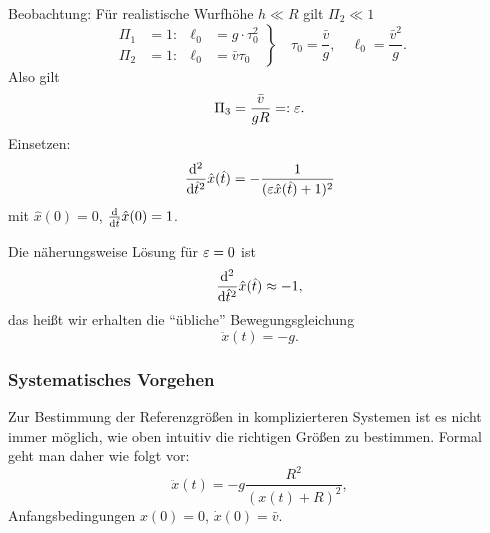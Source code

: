 Beobachtung: Für realistische Wurfhöhe $h \ll R$ gilt $\Pi_2 \ll 1$
\[ \left. \begin{aligned}
      \Pi_1 &= 1: & \ell_0 &= g \cdot \tau_0^2 \\
      \Pi_2 &= 1: & \ell_0 &= \bar{v} \tau_0
    \end{aligned}
  \right\} \quad \tau_0 = \frac{\bar{v}}{g}, \quad \ell_0 =
  \frac{\bar{v}^2}{g}. \]
Also gilt
\[ \Pi_3 = \frac{\bar{v}}{gR} =: \varepsilon. \]
Einsetzen:
\[ \frac{\mathrm{d}^2}{\mathrm{d} \hat{t}^2} \hat{x}(\hat{t}) = - \frac{1}{(\varepsilon
    \hat{x}(\hat{t}) + 1)^2} \]
mit $\hat{x}(0) = 0$, $\frac{\mathrm{d} }{\mathrm{d} \hat{t}} \hat{x}(0) = 1$.

Die näherungsweise Lösung für $\varepsilon = 0$ ist
\[ \frac{\mathrm{d}^2}{\mathrm{d} \hat{t}^2} \hat{x}(\hat{t}) \approx -1, \]
das heißt wir erhalten die ``übliche'' Bewegungsgleichung
\[ \ddot{x}(t) = - g. \]

\subsubsection*{Systematisches Vorgehen}
Zur Bestimmung der Referenzgrößen in komplizierteren Systemen ist es
nicht immer möglich, wie oben intuitiv die richtigen Größen zu bestimmen. Formal
geht man daher wie folgt vor:
\[ \ddot{x}(t) = - g \frac{R^2}{(x(t) + R)^2}, \]
Anfangsbedingungen $x(0) = 0$, $\dot{x}(0) = \bar{v}$.

